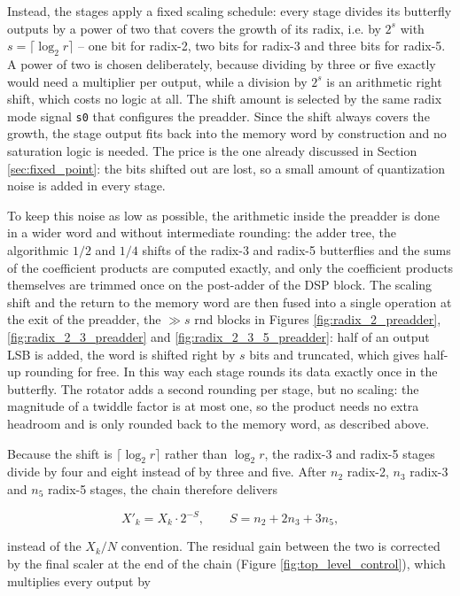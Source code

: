 \documentclass[a4paper,12pt, master]{etf}
\begin{document}
Instead, the stages apply a fixed scaling schedule: every stage divides its butterfly outputs by a power of two that covers the growth of its radix, i.e. by $2^{s}$ with $s = \lceil \log_2 r \rceil$ -- one bit for radix-2, two bits for radix-3 and three bits for radix-5. A power of two is chosen deliberately, because dividing by three or five exactly would need a multiplier per output, while a division by $2^{s}$ is an arithmetic right shift, which costs no logic at all. The shift amount is selected by the same radix mode signal \texttt{s0} that configures the preadder. Since the shift always covers the growth, the stage output fits back into the memory word by construction and no saturation logic is needed. The price is the one already discussed in Section \ref{sec:fixed_point}: the bits shifted out are lost, so a small amount of quantization noise is added in every stage.

To keep this noise as low as possible, the arithmetic inside the preadder is done in a wider word and without intermediate rounding: the adder tree, the algorithmic $1/2$ and $1/4$ shifts of the radix-3 and radix-5 butterflies and the sums of the coefficient products are computed exactly, and only the coefficient products themselves are trimmed once on the post-adder of the DSP block. The scaling shift and the return to the memory word are then fused into a single operation at the exit of the preadder, the $\gg s$ rnd blocks in Figures \ref{fig:radix_2_preadder}, \ref{fig:radix_2_3_preadder} and \ref{fig:radix_2_3_5_preadder}: half of an output LSB is added, the word is shifted right by $s$ bits and truncated, which gives half-up rounding for free. In this way each stage rounds its data exactly once in the butterfly. The rotator adds a second rounding per stage, but no scaling: the magnitude of a twiddle factor is at most one, so the product needs no extra headroom and is only rounded back to the memory word, as described above.

Because the shift is $\lceil \log_2 r \rceil$ rather than $\log_2 r$, the radix-3 and radix-5 stages divide by four and eight instead of by three and five. After $n_2$ radix-2, $n_3$ radix-3 and $n_5$ radix-5 stages, the chain therefore delivers

\begin{equation}
    X'_k = X_k \cdot 2^{-S}, \qquad S = n_2 + 2 n_3 + 3 n_5,
\end{equation}

instead of the $X_k / N$ convention. The residual gain between the two is corrected by the final scaler at the end of the chain (Figure \ref{fig:top_level_control}), which multiplies every output by
\end{document}
